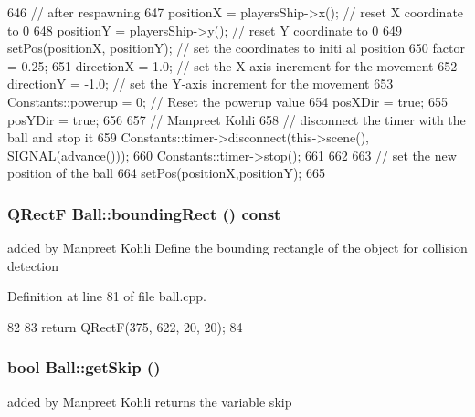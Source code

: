 \begin{DoxyCode}
{{646         // after respawning
647         positionX = playersShip->x();             // reset X coordinate to 0
648         positionY = playersShip->y();             // reset Y coordinate to 0
649         setPos(positionX, positionY);             // set the coordinates to initi
      al position
650         factor = 0.25;
651         directionX = 1.0;                         // set the X-axis increment for
       the movement
652         directionY = -1.0;                        // set the Y-axis increment for
       the movement
653         Constants::powerup = 0;                   // Reset the powerup value
654         posXDir = true;
655         posYDir = true;
656 
657         // Manpreet Kohli
658         // disconnect the timer with the ball and stop it
659         Constants::timer->disconnect(this->scene(), SIGNAL(advance()));
660         Constants::timer->stop();
661     }
662 
663     // set the new position of the ball
664     setPos(positionX,positionY);
665 }
\end{DoxyCode}
\hypertarget{class_ball_ae68484e656a6c7a195e41185c06e9e8f}{
\subsubsection[{boundingRect}]{\setlength{\rightskip}{0pt plus 5cm}QRectF Ball::boundingRect () const}}
\label{class_ball_ae68484e656a6c7a195e41185c06e9e8f}
added by Manpreet Kohli Define the bounding rectangle of the object for collision detection 

Definition at line 81 of file ball.cpp.


\begin{DoxyCode}
82 {
83     return QRectF(375, 622, 20, 20);
84 }
\end{DoxyCode}
\hypertarget{class_ball_a016c7ea71cd5b999189b814dab4b96a3}{
\subsubsection[{getSkip}]{\setlength{\rightskip}{0pt plus 5cm}bool Ball::getSkip ()}}
\label{class_ball_a016c7ea71cd5b999189b814dab4b96a3}
added by Manpreet Kohli returns the variable skip 

